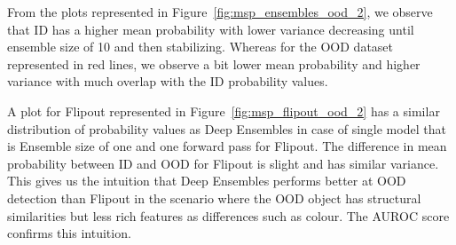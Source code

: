     From the plots represented in Figure~\ref{fig:msp_ensembles_ood_2}, we observe that ID has a higher mean probability with lower variance decreasing until ensemble size of 10 and then stabilizing.
    Whereas for the OOD dataset represented in red lines, we observe a bit lower mean probability and higher variance with much overlap with the ID probability values.
    
    A plot for Flipout represented in Figure~\ref{fig:msp_flipout_ood_2} has a similar distribution of probability values as Deep Ensembles in case of single model that is Ensemble size of one and one forward pass for Flipout.
    The difference in mean probability between ID and OOD for Flipout is slight and has similar variance.
    This gives us the intuition that Deep Ensembles performs better at OOD detection than Flipout in the scenario where the OOD object has structural similarities but less rich features as differences such as colour. The AUROC score confirms this intuition.
    
